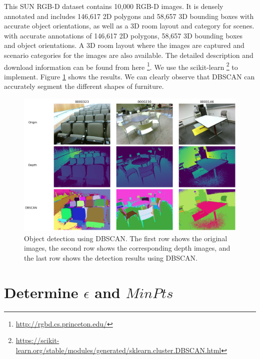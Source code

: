 This SUN RGB-D dataset contains 10,000 RGB-D images. It is densely annotated and includes 146,617 2D polygons and 58,657 3D bounding boxes with accurate object orientations, as well as a 3D room layout and category for scenes.
with accurate annotations of 146,617 2D polygons, 58,657 3D bounding boxes and object orientations. A 3D room layout where the images are captured and scenario categories for the images are also available. 
The detailed description and download information can be found from here 
\footnote{\url{http://rgbd.cs.princeton.edu/}}. We use the scikit-learn 
\footnote{\url{https://scikit-learn.org/stable/modules/generated/sklearn.cluster.DBSCAN.html}}
to implement. Figure \ref{fig:scene} shows the results. We can clearly observe 
that DBSCAN can accurately segment the different shapes of furniture. 
\begin{figure}[h!]
	\label{fig:scene}
\includegraphics[width=\textwidth]{"Part 3 - Learning Systems/Unsupervised Learning/DBScan/figures/segment.png"}
\caption{Object detection using DBSCAN. The first row shows the original 
images, the second row shows the corresponding depth images, and the last row 
shows the detection results using DBSCAN.}
\end{figure}

\section{Determine $\epsilon$ and $MinPts$}

